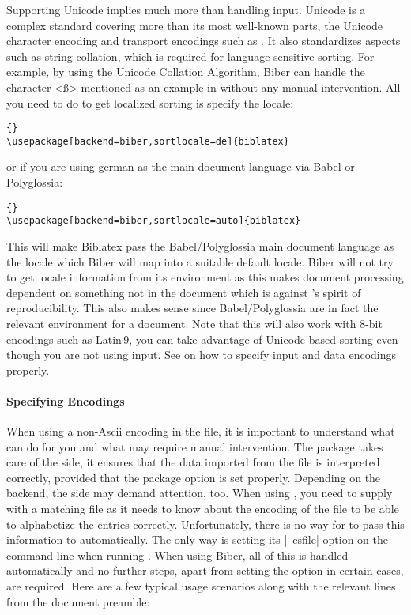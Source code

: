 \documentclass{ltxdockit}[2011/03/25]
\newcommand*{\biber}{Biber\xspace}
\newcommand*{\biblatex}{Biblatex\xspace}
\begin{document}
Supporting Unicode implies much more than handling \utf input. Unicode is a complex standard covering more than its most well-known parts, the Unicode character encoding and transport encodings such as \utf. It also standardizes aspects such as string collation, which is required for language-sensitive sorting. For example, by using the Unicode Collation Algorithm, \biber can handle the character <ß> mentioned as an example in  without any manual intervention. All you need to do to get localized sorting is specify the locale:

\begin{lstlisting}[style=latex]{}
\usepackage[backend=biber,sortlocale=de]{biblatex}
\end{lstlisting}
%
or if you are using german as the main document language via Babel or Polyglossia:

\begin{lstlisting}[style=latex]{}
\usepackage[backend=biber,sortlocale=auto]{biblatex}
\end{lstlisting}
%
This will make \biblatex pass the Babel/Polyglossia main document language
as the locale which \biber will map into a suitable default locale. \biber
will not try to get locale information from its environment as this makes
document processing dependent on something not in the document which is
against \tex's spirit of reproducibility. This also makes sense since
Babel/Polyglossia are in fact the relevant environment for a document. Note
that this will also work with 8-bit encodings such as Latin\,9, \ie you can
take advantage of Unicode-based sorting even though you are not using \utf
input. See  on how to specify input and data
encodings properly.

\paragraph{Specifying Encodings}
\label{bib:cav:enc:enc}
When using a non-Ascii encoding in the  file, it is important to understand what  can do for you and what may require manual intervention. The package takes care of the \latex side, \ie it ensures that the data imported from the  file is interpreted correctly, provided that the  package option is set properly. Depending on the backend, the \bibtex side may demand attention, too. When using , you need to supply  with a matching  file as it needs to know about the encoding of the  file to be able to alphabetize the entries correctly. Unfortunately, there is no way for  to pass this information to  automatically. The only way is setting its |--csfile| option on the command line when running . When using \biber, all of this is handled automatically and no further steps, apart from setting the  option in certain cases, are required. Here are a few typical usage scenarios along with the relevant lines from the document preamble:
\end{document}
